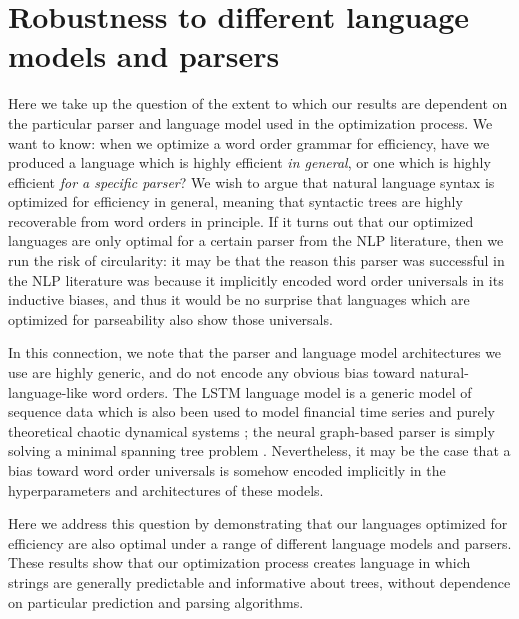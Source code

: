 \documentclass[10pt,twoside,lineno]{article}
\begin{document}


\section{Robustness to different language models and parsers}


Here we take up the question of the extent to which our results are dependent on the particular parser and language model used in the optimization process. We want to know: when we optimize a word order grammar for efficiency, have we produced a language which is highly efficient \emph{in general}, or one which is highly efficient \emph{for a specific parser}? We wish to argue that natural language syntax is optimized for efficiency in general, meaning that syntactic trees are highly recoverable from word orders in principle. If it turns out that our optimized languages are only optimal for a certain parser from the NLP literature, then we run the risk of circularity: it may be that the reason this parser was successful in the NLP literature was because it implicitly encoded word order universals in its inductive biases, and thus it would be no surprise that languages which are optimized for parseability also show those universals.

In this connection, we note that the parser and language model architectures we use are highly generic, and do not encode any obvious bias toward natural-language-like word orders. The LSTM language model is a generic model of sequence data which is also been used to model financial time series \citep{sirignano2018universal} and purely theoretical chaotic dynamical systems \citep{ogunmolu2016nonlinear}; the neural graph-based parser is simply solving a minimal spanning tree problem \citep{mcdonald2005nonprojective}. Nevertheless, it may be the case that a bias toward word order universals is somehow encoded implicitly in the hyperparameters and architectures of these models.

Here we address this question by demonstrating that our languages optimized for efficiency are also optimal under a range of different language models and parsers. These results show that our optimization process creates language in which strings are generally predictable and informative about trees, without dependence on particular prediction and parsing algorithms.
\end{document}

